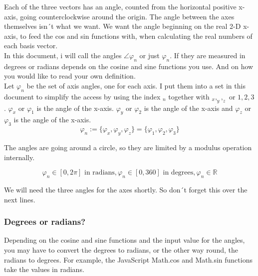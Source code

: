 \documentclass[a4paper]{article}
\begin{document}
Each of the three vectors has an angle, counted from the horizontal positive x-axis, going counterclockwise around the origin. The
angle between the axes themselves isn´t what we want. We want the angle beginning on the real 2-D x-axis, to feed the cos and sin functions with, when calculating the real numbers of each basis vector.\\

In this document, i will call the angles $\angle \varphi_{n}$ or just $\varphi_{n}$. If they are measured in degrees or radians depends on the cosine and sine functions you use. And on how you would like to read your own definition.\\

Let $\varphi_{n}$ be the set of axis angles, one for each axis. I put them into a set in this document to simplify the access by
using the index $_{n}$ together with $_x, _y, _z$ or $1,2,3$. $\varphi_x$ or $\varphi_1$ is the angle of the x-axis. $\varphi_y$ or $\varphi_2$ is the angle of the x-axis and $\varphi_z$ or $\varphi_3$ is the angle of the x-axis. \\

\begin{displaymath}
\varphi_{n} := \{\varphi_x, \varphi_y, \varphi_z\} = \{ \varphi_1, \varphi_2, \varphi_3 \}
\end{displaymath}

The angles are going around a circle, so they are limited by a modulus operation internally.

\begin{displaymath}
 \varphi_n \in [0,2\pi] \mbox{ in radians}, \varphi_n \in [0,360] \mbox{ in degrees}, \varphi_n \in \mathbb{R}
\end{displaymath}

We will need the three angles for the axes shortly. So don´t forget this over the next lines.\\

\subsubsection{Degrees or radians?}

Depending on the cosine and sine functions and the input value for the angles, you may have to convert the degrees to radians, or
the other way round, the radians to degrees. For example, the JavaScript Math.cos and Math.sin functions take the values in radians.\\
\end{document}
